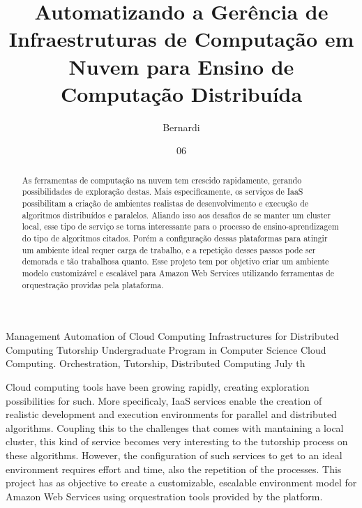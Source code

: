\documentclass[tg]{mdtufsm}
\title{Automatizando a Gerência de Infraestruturas de Computação em Nuvem para Ensino de Computação Distribuída}
\author{Bernardi}{Cezar Augusto Contini}
\institute{Centro de Tecnologia}
\date{06}{Julho}{2016}
\begin{document}
\maketitle



\begin{abstract}
As ferramentas de computação na nuvem tem crescido rapidamente, gerando possibilidades de exploração destas. Mais especificamente, os serviços de IaaS possibilitam a criação de ambientes realistas de desenvolvimento e execução de algoritmos distribuídos e paralelos. Aliando isso aos desafios de se manter um cluster local, esse tipo de serviço se torna interessante para o processo de ensino-aprendizagem do tipo de algoritmos citados. Porém a configuração dessas plataformas para atingir um ambiente ideal requer carga de trabalho, e a repetição desses passos pode ser demorada e tão trabalhosa quanto. Esse projeto tem por objetivo criar um ambiente modelo customizável e escalável para Amazon Web Services utilizando ferramentas de orquestração providas pela plataforma.

\end{abstract}

\begin{englishabstract}
	{Management Automation of Cloud Computing Infrastructures for Distributed Computing Tutorship}
	{Undergraduate Program in Computer Science}
	{Cloud Computing. Orchestration, Tutorship, Distributed Computing}
	{July}
	{th}
	
Cloud computing tools have been growing rapidly, creating exploration possibilities for such. More specificaly, IaaS services enable the creation of realistic development and execution environments for parallel and distributed algorithms. Coupling this to the challenges that comes with mantaining a local cluster, this kind of service becomes very interesting to the tutorship process on these algorithms. However, the configuration of such services to get to an ideal environment requires effort and time, also the repetition of the processes. This project has as objective to create a customizable, escalable environment model for Amazon Web Services using orquestration tools provided by the platform.
	
\end{englishabstract}
\end{document}
